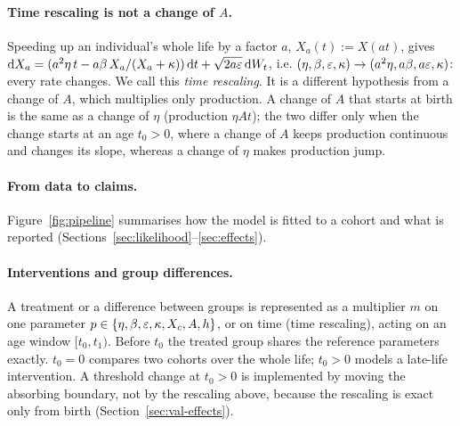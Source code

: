 \paragraph{Time rescaling is not a change of $A$.} Speeding up an individual's whole life by a factor $a$,
$X_a(t):=X(a t)$, gives
$\mathrm{d} X_a=(a^2\eta\,t - a\beta\,X_a/(X_a+\kappa))\,\mathrm{d} t+\sqrt{2a\varepsilon}\,\mathrm{d} W_t$, i.e.
$(\eta,\beta,\varepsilon,\kappa)\to(a^2\eta,a\beta,a\varepsilon,\kappa)$: every rate changes. We call this \emph{time rescaling}.
It is a different hypothesis from a change of $A$, which multiplies only production. A change of $A$ that starts at
birth is the same as a change of $\eta$ (production $\eta A t$); the two differ only when the change starts at an age
$t_0>0$, where a change of $A$ keeps production continuous and changes its slope, whereas a change of $\eta$ makes
production jump.

\paragraph{From data to claims.} Figure~\ref{fig:pipeline} summarises how the model is fitted to a cohort and what
is reported (Sections~\ref{sec:likelihood}--\ref{sec:effects}).



\paragraph{Interventions and group differences.} A treatment or a difference between groups is represented as a
multiplier $m$ on one parameter $p\in\{\eta,\beta,\varepsilon,\kappa,X_c,A,h\}$, or on time (time rescaling), acting on an age
window $[t_0,t_1)$. Before $t_0$ the treated group shares the reference parameters exactly. $t_0=0$ compares two
cohorts over the whole life; $t_0>0$ models a late-life intervention. A threshold change at $t_0>0$ is implemented by
moving the absorbing boundary, not by the rescaling above, because the rescaling is exact only from birth
(Section~\ref{sec:val-effects}).
